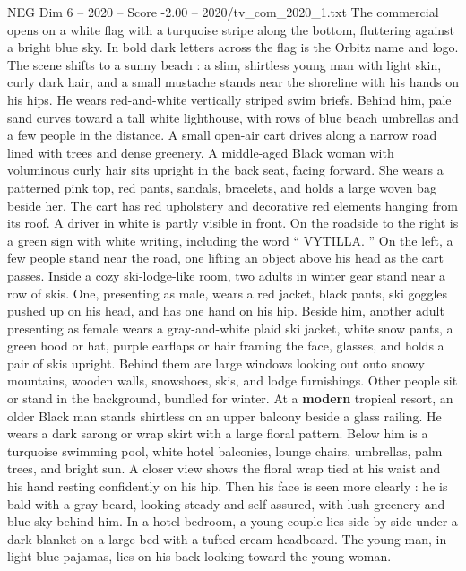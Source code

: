 \begin{textsample}{NEG Dim 6 – 2020 – Score -2.00 – 2020/tv\_com\_2020\_1.txt}  \label{ex:f6_neg_036}
The commercial opens on a white flag with a turquoise stripe along the bottom, fluttering against a bright blue sky.
In bold dark letters across the flag is the Orbitz name and logo.
The scene shifts to a sunny beach : a slim, shirtless young man with light skin, curly dark hair, and a small mustache stands near the shoreline with his hands on his hips.
He wears red-and-white vertically striped swim briefs.
Behind him, pale sand curves toward a tall white lighthouse, with rows of blue beach umbrellas and a few people in the distance.
A small open-air cart drives along a narrow road lined with trees and dense greenery.
A middle-aged Black woman with voluminous curly hair sits upright in the back seat, facing forward.
She wears a patterned pink top, red pants, sandals, bracelets, and holds a large woven bag beside her.
The cart has red upholstery and decorative red elements hanging from its roof.
A driver in white is partly visible in front.
On the roadside to the right is a green sign with white writing, including the word “ VYTILLA. ” On the left, a few people stand near the road, one lifting an object above his head as the cart passes.
Inside a cozy ski-lodge-like room, two adults in winter gear stand near a row of skis.
One, presenting as male, wears a red jacket, black pants, ski goggles pushed up on his head, and has one hand on his hip.
Beside him, another adult presenting as female wears a gray-and-white plaid ski jacket, white snow pants, a green hood or hat, purple earflaps or hair framing the face, glasses, and holds a pair of skis upright.
Behind them are large windows looking out onto snowy mountains, wooden walls, snowshoes, skis, and lodge furnishings.
Other people sit or stand in the background, bundled for winter.
At a \textbf{modern} tropical resort, an older Black man stands shirtless on an upper balcony beside a glass railing.
He wears a dark sarong or wrap skirt with a large floral pattern.
Below him is a turquoise swimming pool, white hotel balconies, lounge chairs, umbrellas, palm trees, and bright sun.
A closer view shows the floral wrap tied at his waist and his hand resting confidently on his hip.
Then his face is seen more clearly : he is bald with a gray beard, looking steady and self-assured, with lush greenery and blue sky behind him.
In a hotel bedroom, a young couple lies side by side under a dark blanket on a large bed with a tufted cream headboard.
The young man, in light blue pajamas, lies on his back looking toward the young woman.

\end{textsample}
